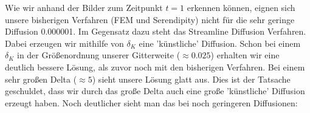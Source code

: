 \begin{figure}[H]
\end{figure}

Wie wir anhand der Bilder zum Zeitpunkt $t=1$ erkennen können, eignen sich unsere bisherigen Verfahren (FEM und Serendipity) nicht für die sehr geringe Diffusion 0.000001. Im Gegensatz dazu steht das Streamline Diffusion Verfahren. Dabei erzeugen wir mithilfe von $\delta_K$ eine 'künstliche' Diffusion. Schon bei einem $\delta_K$ in der Größenordnung unserer Gitterweite ($\approx 0.025$)
erhalten wir eine deutlich bessere Lösung, als zuvor noch mit den bisherigen Verfahren. Bei einem sehr großen Delta 
($\approx 5$) sieht unsere Lösung glatt aus. Dies ist der Tatsache geschuldet, dass wir durch das große Delta auch eine große 'künstliche' Diffusion erzeugt haben. Noch deutlicher sieht man das bei noch geringeren Diffusionen:


